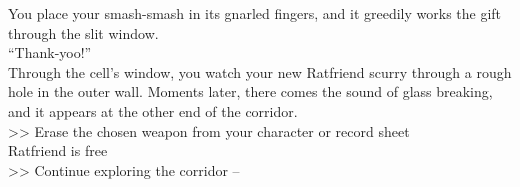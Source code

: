 You place your smash-smash in its gnarled fingers, and it greedily works the gift through the slit window.\\

“Thank-yoo!”\\

Through the cell’s window, you watch your new Ratfriend scurry through a rough hole in the outer wall. Moments later, there comes the sound of glass breaking, and it appears at the other end of the corridor.\\

>> Erase the chosen weapon from your character or record sheet\\
 Ratfriend is free\\
>> Continue exploring the corridor -- 